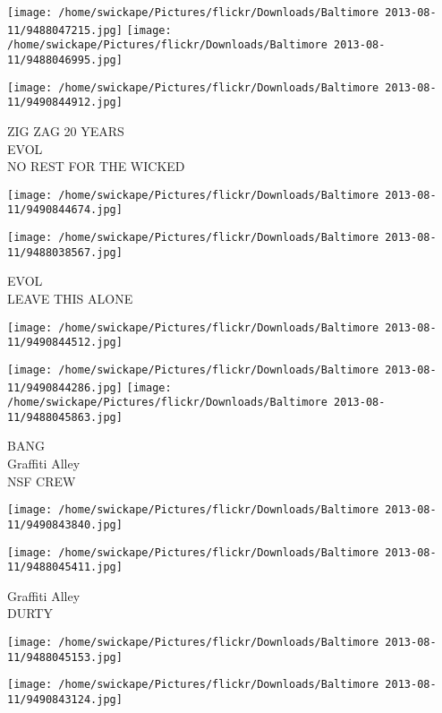 \documentclass[10pt,letterpaper]{article}
\begin{document}
\texttt{[image: /home/swickape/Pictures/flickr/Downloads/Baltimore 2013-08-11/9488047215.jpg]}
\texttt{[image: /home/swickape/Pictures/flickr/Downloads/Baltimore 2013-08-11/9488046995.jpg]}

\vspace{0.25in}
\texttt{[image: /home/swickape/Pictures/flickr/Downloads/Baltimore 2013-08-11/9490844912.jpg]}

ZIG ZAG 20 YEARS\\
EVOL\\
NO REST FOR THE WICKED
\pagebreak

\texttt{[image: /home/swickape/Pictures/flickr/Downloads/Baltimore 2013-08-11/9490844674.jpg]}

\vspace{0.25in}
\texttt{[image: /home/swickape/Pictures/flickr/Downloads/Baltimore 2013-08-11/9488038567.jpg]}

EVOL\\
LEAVE THIS ALONE
\pagebreak

\texttt{[image: /home/swickape/Pictures/flickr/Downloads/Baltimore 2013-08-11/9490844512.jpg]}

\vspace{0.25in}
\texttt{[image: /home/swickape/Pictures/flickr/Downloads/Baltimore 2013-08-11/9490844286.jpg]}
\texttt{[image: /home/swickape/Pictures/flickr/Downloads/Baltimore 2013-08-11/9488045863.jpg]}

BANG\\
Graffiti Alley\\
NSF CREW
\pagebreak

\texttt{[image: /home/swickape/Pictures/flickr/Downloads/Baltimore 2013-08-11/9490843840.jpg]}

\vspace{0.25in}
\texttt{[image: /home/swickape/Pictures/flickr/Downloads/Baltimore 2013-08-11/9488045411.jpg]}

Graffiti Alley\\
DURTY
\pagebreak

\texttt{[image: /home/swickape/Pictures/flickr/Downloads/Baltimore 2013-08-11/9488045153.jpg]}

\vspace{0.25in}
\texttt{[image: /home/swickape/Pictures/flickr/Downloads/Baltimore 2013-08-11/9490843124.jpg]}
\end{document}
